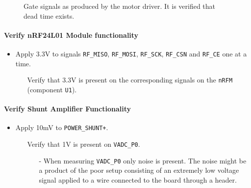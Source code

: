 \begin{figure}[h]
	\centering
	\caption{Gate signals as produced by the motor driver. It is verified that dead time exists.}
	\label{fig:controllerboardv2_gate_b_deadtime}
\end{figure}

\paragraph{Verify nRF24L01 Module functionality} %
\label{par:verify_nrf24l01_module_functionality}
\begin{itemize}
	\item Apply 3.3V to signals \texttt{RF\_MISO}, \texttt{RF\_MOSI}, \texttt{RF\_SCK}, \texttt{RF\_CSN} and \texttt{RF\_CE} one at a time.
	\begin{itemize}
		\item[\cmark] Verify that 3.3V is present on the corresponding signals on the \texttt{nRFM} (component \texttt{U1}).
	\end{itemize}
\end{itemize}

\paragraph{Verify Shunt Amplifier Functionality} %
\label{par:verify_shunt_amplifier_functionality}
\begin{itemize}
	\item Apply 10mV to \texttt{POWER\_SHUNT+}.
	\begin{itemize}
		\item[\xmark] Verify that 1V is present on \texttt{VADC\_P0}.
		\begin{itemize}
			\item[-] When measuring \texttt{VADC\_P0} only noise is present. 
			The noise might be a product of the poor setup consisting of an extremely low voltage signal applied to a wire connected to the board through a header. 
		\end{itemize}
	\end{itemize}
\end{itemize}


